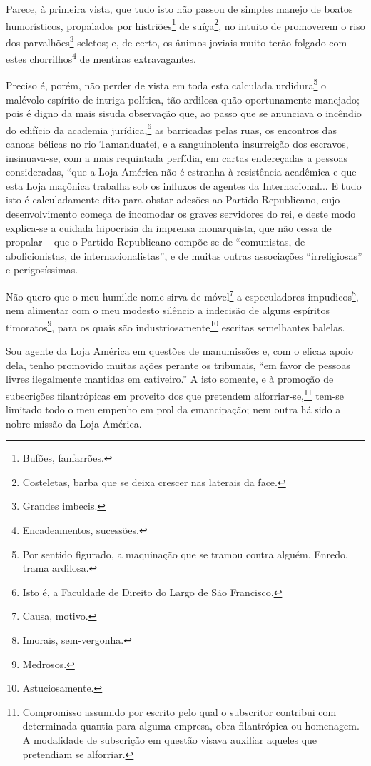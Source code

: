 {Parece, à primeira vista, que tudo isto não passou de simples manejo de
boatos humorísticos, propalados por histriões\footnote{ Bufões,
  fanfarrões.} de suíça\footnote{ Costeletas, barba que se deixa
  crescer nas laterais da face.}, no intuito de promoverem o riso dos
parvalhões\footnote{ Grandes imbecis.} seletos; e, de certo, os ânimos
joviais muito terão folgado com estes chorrilhos\footnote{
  Encadeamentos, sucessões.} de mentiras extravagantes.

Preciso é, porém, não perder de vista em toda esta calculada
urdidura\footnote{ Por sentido figurado, a maquinação que se tramou
  contra alguém. Enredo, trama ardilosa.} o malévolo espírito de intriga
política, tão ardilosa quão oportunamente manejado; pois é digno da mais
sisuda observação que, ao passo que se anunciava o incêndio do edifício
da academia jurídica,\footnote{ Isto é, a Faculdade de Direito do Largo
  de São Francisco.} as barricadas pelas ruas, os encontros das canoas
bélicas no rio Tamanduateí, e a sanguinolenta insurreição dos escravos,
insinuava-se, com a mais requintada perfídia, em cartas endereçadas a
pessoas consideradas, ``que a Loja América não é estranha à resistência
acadêmica e que esta Loja maçônica trabalha sob os influxos de agentes
da Internacional... E tudo isto é calculadamente dito para obstar
adesões ao Partido Republicano, cujo desenvolvimento começa de incomodar
os graves servidores do rei, e deste modo explica-se a cuidada
hipocrisia da imprensa monarquista, que não cessa de propalar -- que o
Partido Republicano compõe-se de ``comunistas, de abolicionistas, de
internacionalistas'', e de muitas outras associações ``irreligiosas'' e
perigosíssimas.

Não quero que o meu humilde nome sirva de móvel\footnote{ Causa,
  motivo.} a especuladores impudicos\footnote{ Imorais, sem-vergonha.},
nem alimentar com o meu modesto silêncio a indecisão de alguns espíritos
timoratos\footnote{ Medrosos.}, para os quais são
industriosamente\footnote{ Astuciosamente.} escritas semelhantes
balelas.

Sou agente da Loja América em questões de manumissões e, com o eficaz
apoio dela, tenho promovido muitas ações perante os tribunais, ``em favor
de pessoas livres ilegalmente mantidas em cativeiro.'' A isto somente, e
à promoção de subscrições filantrópicas em proveito dos que pretendem
alforriar-se,\footnote{ Compromisso assumido por escrito pelo qual o
  subscritor contribui com determinada quantia para alguma empresa, obra
  filantrópica ou homenagem. A modalidade de subscrição em questão
  visava auxiliar aqueles que pretendiam se alforriar.} tem-se limitado
todo o meu empenho em prol da emancipação; nem outra há sido a nobre
missão da Loja América.

}
